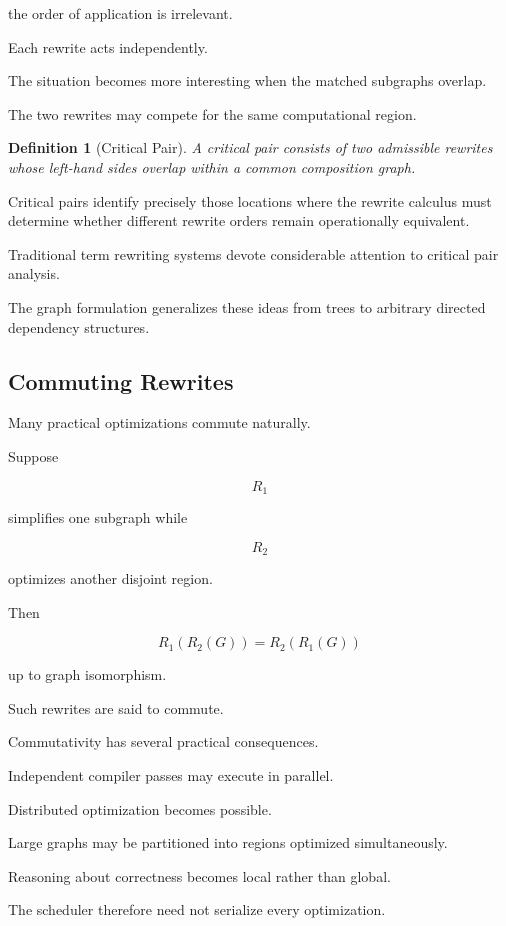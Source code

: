 \documentclass[12pt,oneside]{article}
\newtheorem{definition}{Definition}[section]
\begin{document}
the order of application is irrelevant.

Each rewrite acts independently.

The situation becomes more interesting when the matched subgraphs overlap.

The two rewrites may compete for the same computational region.

\begin{definition}[Critical Pair]

A critical pair consists of two admissible rewrites whose left-hand sides overlap within a common composition graph.

\end{definition}

Critical pairs identify precisely those locations where the rewrite calculus must determine whether different rewrite orders remain operationally equivalent.

Traditional term rewriting systems devote considerable attention to critical pair analysis.

The graph formulation generalizes these ideas from trees to arbitrary directed dependency structures.

\subsection{Commuting Rewrites}

Many practical optimizations commute naturally.

Suppose

\[
R_1
\]

simplifies one subgraph while

\[
R_2
\]

optimizes another disjoint region.

Then

\[
R_1(R_2(G))
=
R_2(R_1(G))
\]

up to graph isomorphism.

Such rewrites are said to commute.

Commutativity has several practical consequences.

Independent compiler passes may execute in parallel.

Distributed optimization becomes possible.

Large graphs may be partitioned into regions optimized simultaneously.

Reasoning about correctness becomes local rather than global.

The scheduler therefore need not serialize every optimization.
\end{document}
